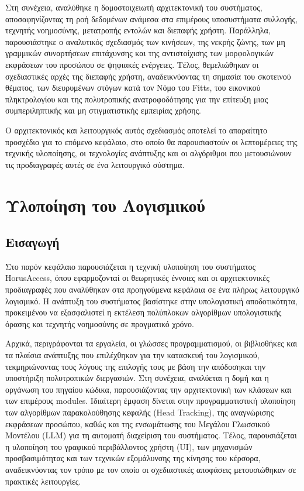 \documentclass[twoside, a4paper, 11pt]{article}
\newcommand{\textlatin}[1]{\textenglish{#1}}
\begin{document}
Στη συνέχεια, αναλύθηκε η δομοστοιχειωτή αρχιτεκτονική του συστήματος, αποσαφηνίζοντας τη ροή δεδομένων ανάμεσα στα επιμέρους υποσυστήματα συλλογής, τεχνητής νοημοσύνης, μετατροπής εντολών και διεπαφής χρήστη. Παράλληλα, παρουσιάστηκε ο αναλυτικός σχεδιασμός των κινήσεων, της νεκρής ζώνης, των μη γραμμικών συναρτήσεων επιτάχυνσης και της αντιστοίχισης των μορφολογικών εκφράσεων του προσώπου σε ψηφιακές ενέργειες. Τέλος, θεμελιώθηκαν οι σχεδιαστικές αρχές της διεπαφής χρήστη, αναδεικνύοντας τη σημασία του σκοτεινού θέματος, των διευρυμένων στόγων κατά τον Νόμο του \textlatin{Fitts}, του εικονικού πληκτρολογίου και της πολυτροπικής ανατροφοδότησης για την επίτευξη μιας συμπεριληπτικής και μη στιγματιστικής εμπειρίας χρήσης.

Ο αρχιτεκτονικός και λειτουργικός αυτός σχεδιασμός αποτελεί το απαραίτητο προσχέδιο για το επόμενο κεφάλαιο, στο οποίο θα παρουσιαστούν οι λεπτομέρειες της τεχνικής υλοποίησης, οι τεχνολογίες ανάπτυξης και οι αλγόριθμοι που μετουσιώνουν τις προδιαγραφές αυτές σε ένα λειτουργικό σύστημα.

\clearpage
\section{Υλοποίηση του Λογισμικού}

\subsection{Εισαγωγή}

Στο παρόν κεφάλαιο παρουσιάζεται η τεχνική υλοποίηση του συστήματος HorusAccess, 
όπου εφαρμοζονταί οι θεωρητικές έννοιες και οι αρχιτεκτονικές προδιαγραφές που αναλύθηκαν στα προηγούμενα κεφάλαια 
σε ένα πλήρως λειτουργικό λογισμικό. Η ανάπτυξη του συστήματος βασίστηκε στην υπολογιστική αποδοτικότητα, 
προκειμένου να εξασφαλιστεί η εκτέλεση πολύπλοκων αλγορίθμων υπολογιστικής όρασης και τεχνητής νοημοσύνης σε πραγματικό χρόνο.

Αρχικά, περιγράφονται τα εργαλεία, οι γλώσσες προγραμματισμού, 
οι βιβλιοθήκες και τα πλαίσια ανάπτυξης που επιλέχθηκαν για την κατασκευή του λογισμικού, 
τεκμηριώνοντας τους λόγους της επιλογής τους με βάση την απόδοσηκαι την υποστήριξη πολυτροπικών διεργασιών. 
Στη συνέχεια, αναλύεται η δομή και η οργάνωση του πηγαίου κώδικα, παρουσιάζοντας την αρχιτεκτονική των κλάσεων και των επιμέρους 
modules. Ιδιαίτερη έμφαση δίνεται στην προγραμματιστική υλοποίηση των αλγορίθμων παρακολούθησης 
κεφαλής (Head Tracking), της αναγνώρισης εκφράσεων προσώπου, 
καθώς και της ενσωμάτωσης του Μεγάλου Γλωσσικού Μοντέλου (LLM) για τη αυτοματή διαχείριση του συστήματος. 
Τέλος, παρουσιάζεται η υλοποίηση του γραφικού περιβάλλοντος χρήστη (UI), των μηχανισμών προσβασιμότητας και των τεχνικών
 εξομάλυνσης της κίνησης του κέρσορα, αναδεικνύοντας τον τρόπο με τον οποίο οι σχεδιαστικές αποφάσεις μετουσιώθηκαν σε πρακτικές
  λειτουργίες.
\end{document}
